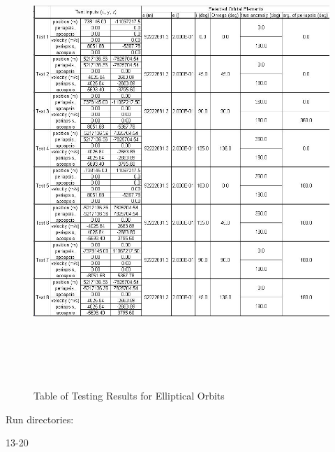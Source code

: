 \begin{description}
\begin{figure}[h]
\begin{center}
\includegraphics[height=170mm]{JPGfiles/ecc_in_all.jpg}
\caption{Table of Testing Results for Elliptical Orbits}
\label{cir_ecc_all}
\end{center}
\end{figure}

Run directories:

13-20

\end{description}

